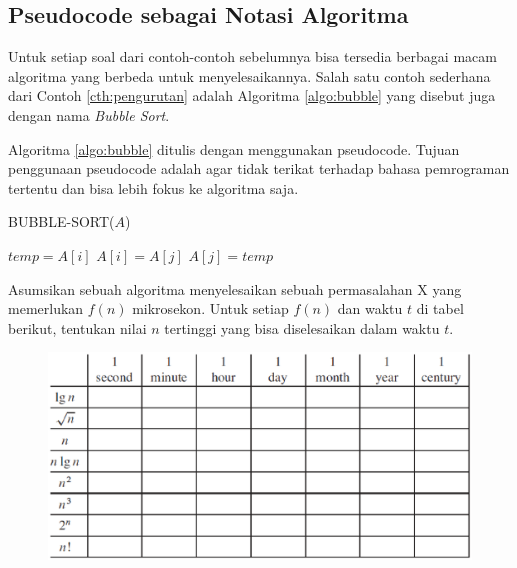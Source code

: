 \subsection{Pseudocode sebagai Notasi Algoritma}
Untuk setiap soal dari contoh-contoh sebelumnya bisa tersedia berbagai macam algoritma yang berbeda untuk menyelesaikannya. Salah satu contoh sederhana dari Contoh \ref{cth:pengurutan} adalah Algoritma \ref{algo:bubble} yang disebut juga dengan nama \textit{Bubble Sort}. 

Algoritma \ref{algo:bubble} ditulis dengan menggunakan pseudocode. Tujuan penggunaan pseudocode adalah agar tidak terikat terhadap bahasa pemrograman tertentu dan bisa lebih fokus ke algoritma saja.

\begin{algorithm}
	\caption{BUBBLE-SORT($A$)}
	\label{algo:bubble}
	\begin{algorithmic}[1]
			\STATE $temp = A[i]$
			\STATE $A[i] = A[j]$
			\STATE $A[j] = temp$
			\ENDIF
		\ENDFOR
	\ENDFOR
	\end{algorithmic}
\end{algorithm}


\begin{konsep}
Asumsikan sebuah algoritma menyelesaikan sebuah permasalahan X yang memerlukan $f(n)$ mikrosekon. Untuk setiap $f(n)$ dan waktu $t$ di tabel berikut, tentukan nilai $n$ tertinggi yang bisa diselesaikan dalam waktu $t$.
\begin{figure}%
\centering
\includegraphics[scale=0.5]{fig/tableEksekusi.eps}%
\end{figure}
\end{konsep}

